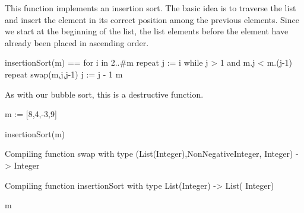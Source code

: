 \begin{xtc}
\begin{xtccomment}
This function implements an insertion sort.
The basic idea is to traverse the list and insert the 
element in its correct position among the  previous
elements.
Since we start at the beginning of the list, the list elements before the
 element have already been placed in ascending order.
\end{xtccomment}
\begin{spadsrc}
insertionSort(m) ==
  for i in 2..#m repeat
    j := i
    while j > 1 and m.j < m.(j-1) repeat
      swap(m,j,j-1)
      j := j - 1
  m
\end{spadsrc}
\end{xtc}
\begin{xtc}
\begin{xtccomment}
As with our bubble sort, this is a destructive function.
\end{xtccomment}
\begin{spadsrc}
m := [8,4,-3,9] 
\end{spadsrc}
\begin{TeXOutput}
\begin{fricasmath}{10}
%
\end{fricasmath}
\end{TeXOutput}
\end{xtc}
\begin{xtc}
\begin{xtccomment}
\end{xtccomment}
\begin{spadsrc}
insertionSort(m) 
\end{spadsrc}
\begin{MessageOutput}
   Compiling function swap with type (List(Integer),NonNegativeInteger,
      Integer) -> Integer 
\end{MessageOutput}
\begin{MessageOutput}
   Compiling function insertionSort with type List(Integer) -> List(
      Integer) 
\end{MessageOutput}
\begin{TeXOutput}
\begin{fricasmath}{11}
%
\end{fricasmath}
\end{TeXOutput}
\end{xtc}
\begin{xtc}
\begin{xtccomment}
\end{xtccomment}
\begin{spadsrc}
m 
\end{spadsrc}
\begin{TeXOutput}
\begin{fricasmath}{12}
%
\end{fricasmath}
\end{TeXOutput}
\end{xtc}

